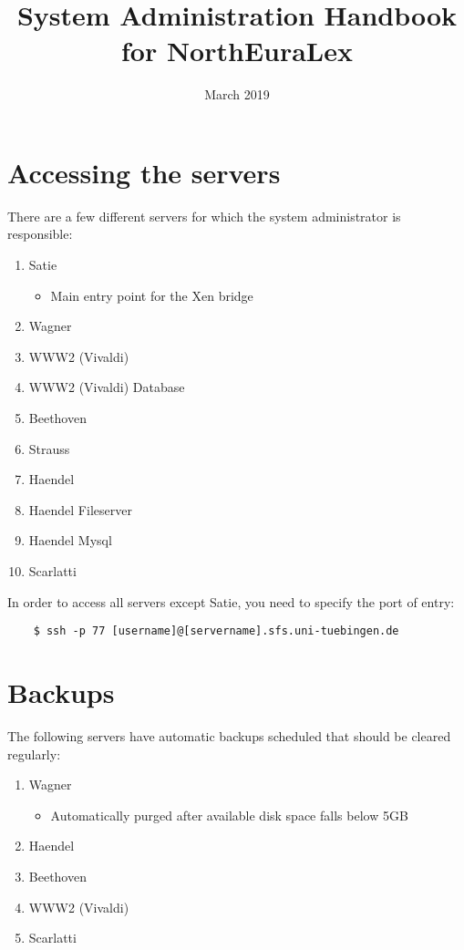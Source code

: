 \documentclass[11pt, a4paper]{article}
\title{\textbf{System Administration Handbook for NorthEuraLex}}
\author{
\date{March 2019}
}
\begin{document}
\maketitle

\section{Accessing the servers}

There are a few different servers for which the system administrator is responsible:

\begin{enumerate}
\item Satie
\begin{itemize}
\item Main entry point for the Xen bridge
\end{itemize}
\item Wagner
\item WWW2 (Vivaldi)
\item WWW2 (Vivaldi) Database
\item Beethoven
\item Strauss
\item Haendel
\item Haendel Fileserver
\item Haendel Mysql
\item Scarlatti
\end{enumerate}

\noindent
In order to access all servers except Satie, you need to specify the port of entry:

\begin{verbatim}
    $ ssh -p 77 [username]@[servername].sfs.uni-tuebingen.de
\end{verbatim}

\section{Backups}

The following servers have automatic backups scheduled that should be cleared regularly:

\begin{enumerate}

\item Wagner
\begin{itemize}
\item Automatically purged after available disk space falls below 5GB
\end{itemize}

\item Haendel
\item Beethoven
\item WWW2 (Vivaldi)
\item Scarlatti

\end{enumerate}
\end{document}

